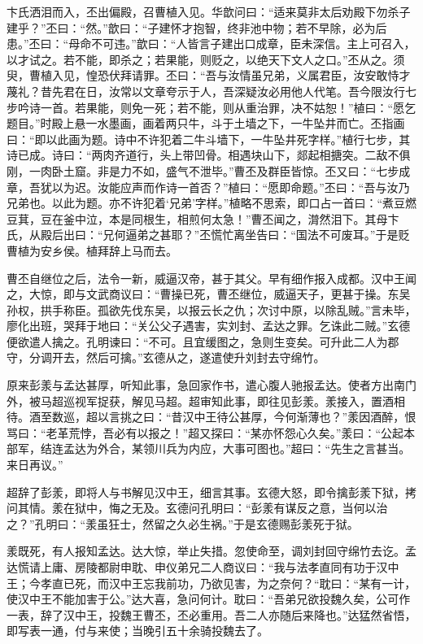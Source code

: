 卞氏洒泪而入，丕出偏殿，召曹植入见。华歆问曰：“适来莫非太后劝殿下勿杀子建乎？”丕曰：“然。”歆曰：“子建怀才抱智，终非池中物；若不早除，必为后患。”丕曰：“母命不可违。”歆曰：“人皆言子建出口成章，臣未深信。主上可召入，以才试之。若不能，即杀之；若果能，则贬之，以绝天下文人之口。”丕从之。须臾，曹植入见，惶恐伏拜请罪。丕曰：“吾与汝情虽兄弟，义属君臣，汝安敢恃才蔑礼？昔先君在日，汝常以文章夸示于人，吾深疑汝必用他人代笔。吾今限汝行七步吟诗一首。若果能，则免一死；若不能，则从重治罪，决不姑恕！”植曰：“愿乞题目。”时殿上悬一水墨画，画着两只牛，斗于土墙之下，一牛坠井而亡。丕指画曰：“即以此画为题。诗中不许犯着二牛斗墙下，一牛坠井死字样。”植行七步，其诗已成。诗曰：“两肉齐道行，头上带凹骨。相遇块山下，郯起相搪突。二敌不俱刚，一肉卧土窟。非是力不如，盛气不泄毕。”曹丕及群臣皆惊。丕又曰：“七步成章，吾犹以为迟。汝能应声而作诗一首否？”植曰：“愿即命题。”丕曰：“吾与汝乃兄弟也。以此为题。亦不许犯着‘兄弟’字样。”植略不思索，即口占一首曰：“煮豆燃豆萁，豆在釜中泣，本是同根生，相煎何太急！”曹丕闻之，潸然泪下。其母卞氏，从殿后出曰：“兄何逼弟之甚耶？”丕慌忙离坐告曰：“国法不可废耳。”于是贬曹植为安乡侯。植拜辞上马而去。

曹丕自继位之后，法令一新，威逼汉帝，甚于其父。早有细作报入成都。汉中王闻之，大惊，即与文武商议曰：“曹操已死，曹丕继位，威逼天子，更甚于操。东吴孙权，拱手称臣。孤欲先伐东吴，以报云长之仇；次讨中原，以除乱贼。”言未毕，廖化出班，哭拜于地曰：“关公父子遇害，实刘封、孟达之罪。乞诛此二贼。”玄德便欲遣人擒之。孔明谏曰：“不可。且宜缓图之，急则生变矣。可升此二人为郡守，分调开去，然后可擒。”玄德从之，遂遣使升刘封去守绵竹。

原来彭羕与孟达甚厚，听知此事，急回家作书，遣心腹人驰报孟达。使者方出南门外，被马超巡视军捉获，解见马超。超审知此事，即往见彭羕。羕接入，置酒相待。酒至数巡，超以言挑之曰：“昔汉中王待公甚厚，今何渐薄也？”羕因酒醉，恨骂曰：“老革荒悖，吾必有以报之！”超又探曰：“某亦怀怨心久矣。”羕曰：“公起本部军，结连孟达为外合，某领川兵为内应，大事可图也。”超曰：“先生之言甚当。来日再议。”

超辞了彭羕，即将人与书解见汉中王，细言其事。玄德大怒，即令擒彭羕下狱，拷问其情。羕在狱中，悔之无及。玄德问孔明曰：“彭羕有谋反之意，当何以治之？”孔明曰：“羕虽狂士，然留之久必生祸。”于是玄德赐彭羕死于狱。

羕既死，有人报知孟达。达大惊，举止失措。忽使命至，调刘封回守绵竹去讫。孟达慌请上庸、房陵都尉申耽、申仪弟兄二人商议曰：“我与法孝直同有功于汉中王；今孝直已死，而汉中王忘我前功，乃欲见害，为之奈何？“耽曰：“某有一计，使汉中王不能加害于公。”达大喜，急问何计。耽曰：“吾弟兄欲投魏久矣，公可作一表，辞了汉中王，投魏王曹丕，丕必重用。吾二人亦随后来降也。”达猛然省悟，即写表一通，付与来使；当晚引五十余骑投魏去了。

